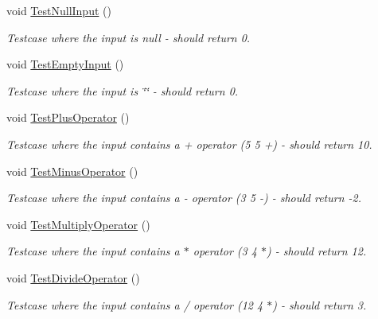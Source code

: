 \begin{DoxyCompactItemize}
\item 
void \hyperlink{class_inheritance_r_p_c___project_1_1_inheritance_r_p_ctests_a4c6edd31f8ff287ac9a618596e5d8633}{Test\+Null\+Input} ()
\begin{DoxyCompactList}\small\item\em Testcase where the input is null -\/ should return 0. \end{DoxyCompactList}\item 
void \hyperlink{class_inheritance_r_p_c___project_1_1_inheritance_r_p_ctests_a40139282f6bc5a4363c8db540655dfb4}{Test\+Empty\+Input} ()
\begin{DoxyCompactList}\small\item\em Testcase where the input is \char`\"{}\char`\"{} -\/ should return 0. \end{DoxyCompactList}\item 
void \hyperlink{class_inheritance_r_p_c___project_1_1_inheritance_r_p_ctests_a32c3a70765db243c4ad0d53f9ea91d59}{Test\+Plus\+Operator} ()
\begin{DoxyCompactList}\small\item\em Testcase where the input contains a + operator (5 5 +) -\/ should return 10. \end{DoxyCompactList}\item 
void \hyperlink{class_inheritance_r_p_c___project_1_1_inheritance_r_p_ctests_a4634991cebc634f25d8877382142f1f8}{Test\+Minus\+Operator} ()
\begin{DoxyCompactList}\small\item\em Testcase where the input contains a -\/ operator (3 5 -\/) -\/ should return -\/2. \end{DoxyCompactList}\item 
void \hyperlink{class_inheritance_r_p_c___project_1_1_inheritance_r_p_ctests_a46d87cf2cd663bed9f7a26baab95391c}{Test\+Multiply\+Operator} ()
\begin{DoxyCompactList}\small\item\em Testcase where the input contains a $\ast$ operator (3 4 $\ast$) -\/ should return 12. \end{DoxyCompactList}\item 
void \hyperlink{class_inheritance_r_p_c___project_1_1_inheritance_r_p_ctests_a3ef7bd9323a34056c802c84825131468}{Test\+Divide\+Operator} ()
\begin{DoxyCompactList}\small\item\em Testcase where the input contains a / operator (12 4 $\ast$) -\/ should return 3. \end{DoxyCompactList}\item 

\end{DoxyCompactItemize}
